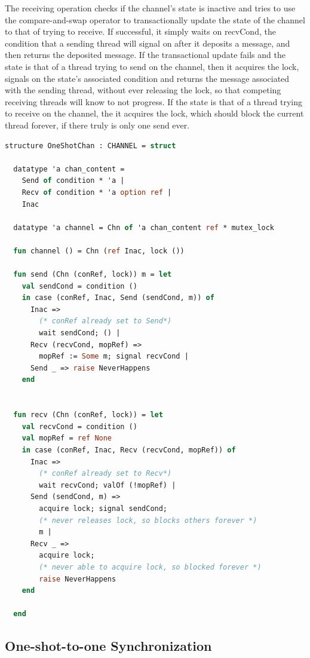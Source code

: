 \documentclass[10pt]{article}
\begin{document}
The receiving operation checks if the channel's state is inactive and tries to use the
compare-and-swap operator to transactionally update the state of the channel to that of trying
to receive.  If successful, it simply waits on recvCond, the condition that a sending thread
will signal on after it deposits a message, and then returns the deposited message.  If the
transactional update fails and the state is that of a thread trying to send on the channel,
then it acquires the lock, signals on the state's associated condition and returns the message
associated with the sending thread, without ever releasing the lock, so that competing
receiving threads will know to not progress.  If the state is that of a thread trying to
receive on the channel, the it acquires the lock, which should block the current thread
forever, if there truly is only one send ever.


\begin{lstlisting}[language=ML, mathescape]
  structure OneShotChan : CHANNEL = struct

  datatype 'a chan_content =
    Send of condition * 'a |
    Recv of condition * 'a option ref |
    Inac  

  datatype 'a channel = Chn of 'a chan_content ref * mutex_lock

  fun channel () = Chn (ref Inac, lock ())

  fun send (Chn (conRef, lock)) m = let
    val sendCond = condition ()
    in case (conRef, Inac, Send (sendCond, m)) of
      Inac =>
        (* conRef already set to Send*)
        wait sendCond; () |
      Recv (recvCond, mopRef) =>
        mopRef := Some m; signal recvCond |
      Send _ => raise NeverHappens
    end


  fun recv (Chn (conRef, lock)) = let
    val recvCond = condition ()
    val mopRef = ref None
    in case (conRef, Inac, Recv (recvCond, mopRef)) of
      Inac =>
        (* conRef already set to Recv*)
        wait recvCond; valOf (!mopRef) |
      Send (sendCond, m) =>
        acquire lock; signal sendCond;
        (* never releases lock, so blocks others forever *)
        m |
      Recv _ =>
        acquire lock;
        (* never able to acquire lock, so blocked forever *)
        raise NeverHappens
    end

  end
  \end{lstlisting}


\subsection{One-shot-to-one Synchronization}
\end{document}
